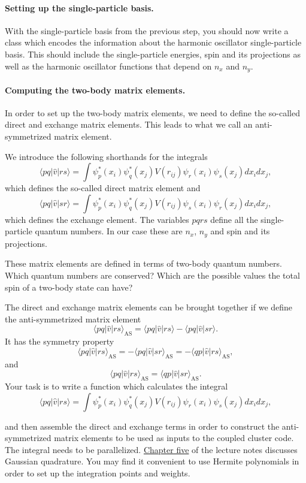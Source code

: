 \documentclass[%
oneside,                 %
final,                   %
10pt]{article}
\begin{document}
\paragraph{Setting up the single-particle basis.}
With the single-particle basis from the previous step, you should now write a class which encodes the information about the harmonic oscillator single-particle basis. This should include the single-particle energies, spin and its projections as well as the harmonic oscillator  functions that depend on $n_x$ and $n_y$. 

\paragraph{Computing the two-body matrix elements.}
In order to set up the two-body matrix elements, we need to define the so-called direct and exchange matrix elements. This leads to what we call an anti-symmetrized matrix element.

We introduce the following shorthands for the  integrals
\[
\langle pq|\hat{v}|rs\rangle =  \int \psi_{p}^*(x_i)\psi_{q}^*(x_j)V(r_{ij})\psi_{r}(x_i)\psi_{s}(x_j)
    dx_idx_j,
\]
which defines the so-called direct matrix element 
and
\[
\langle pq|\hat{v}|sr\rangle = \int \psi_{p}^*(x_i)\psi_{q}^*(x_j)
  V(r_{ij})\psi_{s}(x_i)\psi_{r}(x_j)
  dx_idx_j,  
\]
which defines the exchange element. The variables $pqrs$ define all the single-particle quantum numbers. In our case these are $n_x$, $n_y$ and spin and its projections.

These matrix elements are defined in terms of two-body quantum numbers. Which quantum numbers are conserved?
Which are  the possible values the total spin of a two-body state can have?

The direct and exchange matrix elements can be  brought together if we define the anti-symmetrized matrix element
\[
\langle pq|\hat{v}|rs\rangle_{\mathrm{AS}}= \langle pq|\hat{v}|rs\rangle-\langle pq|\hat{v}|sr\rangle.
\]
It has the symmetry property
\[
\langle pq|\hat{v}|rs\rangle_{\mathrm{AS}}= -\langle pq|\hat{v}|sr\rangle_{\mathrm{AS}}=-\langle qp|\hat{v}|rs\rangle_{\mathrm{AS}},
\]
and
\[
\langle pq|\hat{v}|rs\rangle_{\mathrm{AS}}= \langle qp|\hat{v}|sr\rangle_{\mathrm{AS}}.
\]
Your task is to write a function which calculates the integral 
\[
\langle pq|\hat{v}|rs\rangle =  \int \psi_{p}^*(x_i)\psi_{q}^*(x_j)V(r_{ij})\psi_{r}(x_i)\psi_{s}(x_j)
    dx_idx_j,
\]

and then assemble the direct and exchange terms in order to construct
the anti-symmetrized matrix elements to be used as inputs to the
coupled cluster code. The integral needs to be parallelized.
\href{{https://github.com/CompPhysics/ComputationalPhysics2/blob/gh-pages/doc/Literature/lectures2015.pdf}}{Chapter
five}
of the lecture notes discusses Gaussian quadrature. You may find it
convenient to use Hermite polynomials in order to set up the
integration points and weights.
\end{document}
